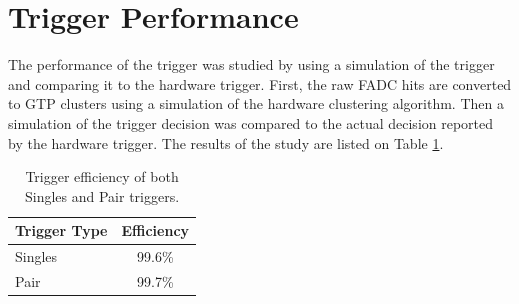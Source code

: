 
\section{Trigger Performance}

The performance of the trigger was studied by using a simulation of the trigger
and comparing it to the hardware trigger.  First, the raw FADC hits are converted
to GTP clusters using a simulation of the hardware clustering algorithm. Then
a simulation of the trigger decision was compared to the actual decision reported
by the hardware trigger.  The results of the study are listed on Table 
\ref{tab:trig_eff}.
\begin{table}[h!]
    \centering
    \begin{tabular}{lc}
        \toprule
        \textbf{Trigger Type} & \textbf{Efficiency} \\
        \midrule
        \midrule
        Singles               & 99.6\%              \\
        Pair                  & 99.7\%              \\
        \bottomrule
    \end{tabular}
    \caption{Trigger efficiency of both Singles and Pair triggers.}
    \label{tab:trig_eff}
\end{table}



